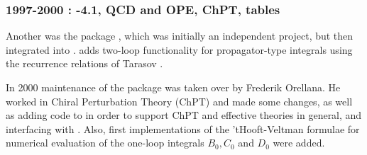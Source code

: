\subsubsection*{1997-2000 : -4.1, QCD and OPE, ChPT, tables}

Another was the package \tarcer, which was initially an independent project, but then integrated
into \fc.  \tarcer \cite{Mertig:1998vk} adds two-loop functionality for propagator-type integrals
using the recurrence relations of Tarasov \cite{Tarasov:1997kx}.

In 2000 maintenance of the package was taken over by Frederik Orellana.
He worked in Chiral Perturbation Theory \cite{Gasser:1984gg} (ChPT) and made some changes, as well
as adding code to \fc in order to support ChPT and effective theories in general, and interfacing
with \fa. Also, first implementations of the 'tHooft-Veltman formulae \cite{'tHooft:1978xw} for
numerical evaluation of the one-loop integrals $B_0, C_0$ and $D_0$ were added. 